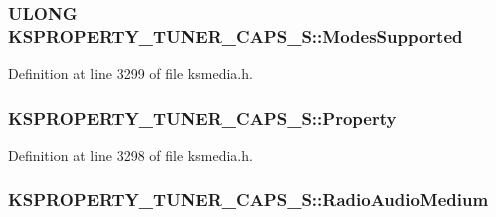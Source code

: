 \subsubsection[{\texorpdfstring{Modes\+Supported}{ModesSupported}}]{\setlength{\rightskip}{0pt plus 5cm}U\+L\+O\+NG K\+S\+P\+R\+O\+P\+E\+R\+T\+Y\+\_\+\+T\+U\+N\+E\+R\+\_\+\+C\+A\+P\+S\+\_\+\+S\+::\+Modes\+Supported}\hypertarget{struct_k_s_p_r_o_p_e_r_t_y___t_u_n_e_r___c_a_p_s___s_a915de943958c3543844f91eaa7e860c1}{}\label{struct_k_s_p_r_o_p_e_r_t_y___t_u_n_e_r___c_a_p_s___s_a915de943958c3543844f91eaa7e860c1}


Definition at line 3299 of file ksmedia.\+h.

\subsubsection[{\texorpdfstring{Property}{Property}}]{ K\+S\+P\+R\+O\+P\+E\+R\+T\+Y\+\_\+\+T\+U\+N\+E\+R\+\_\+\+C\+A\+P\+S\+\_\+\+S\+::\+Property}\hypertarget{struct_k_s_p_r_o_p_e_r_t_y___t_u_n_e_r___c_a_p_s___s_a58b90a729413b011ba1b1400e68bb593}{}\label{struct_k_s_p_r_o_p_e_r_t_y___t_u_n_e_r___c_a_p_s___s_a58b90a729413b011ba1b1400e68bb593}


Definition at line 3298 of file ksmedia.\+h.

\subsubsection[{\texorpdfstring{Radio\+Audio\+Medium}{RadioAudioMedium}}]{ K\+S\+P\+R\+O\+P\+E\+R\+T\+Y\+\_\+\+T\+U\+N\+E\+R\+\_\+\+C\+A\+P\+S\+\_\+\+S\+::\+Radio\+Audio\+Medium}\hypertarget{struct_k_s_p_r_o_p_e_r_t_y___t_u_n_e_r___c_a_p_s___s_a7d82500fa94f509ab8c30c4f78676eb4}{}\label{struct_k_s_p_r_o_p_e_r_t_y___t_u_n_e_r___c_a_p_s___s_a7d82500fa94f509ab8c30c4f78676eb4}


